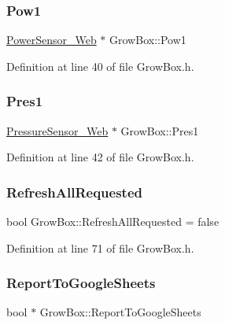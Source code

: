 \subsubsection{\texorpdfstring{Pow1}{Pow1}}
{\footnotesize\ttfamily \hyperlink{class_power_sensor___web}{Power\+Sensor\+\_\+\+Web} $\ast$ Grow\+Box\+::\+Pow1}



Definition at line 40 of file Grow\+Box.\+h.

\mbox{\label{class_grow_box_aa1868c61de725635c872ebae62f9d3a6}} 
\subsubsection{\texorpdfstring{Pres1}{Pres1}}
{\footnotesize\ttfamily \hyperlink{class_pressure_sensor___web}{Pressure\+Sensor\+\_\+\+Web} $\ast$ Grow\+Box\+::\+Pres1}



Definition at line 42 of file Grow\+Box.\+h.

\mbox{\label{class_grow_box_a7f3cd6990537a64901739ea4677693f8}} 
\subsubsection{\texorpdfstring{Refresh\+All\+Requested}{RefreshAllRequested}}
{\footnotesize\ttfamily bool Grow\+Box\+::\+Refresh\+All\+Requested = false\hspace{0.3cm}{\ttfamily [protected]}}



Definition at line 71 of file Grow\+Box.\+h.

\mbox{\label{class_grow_box_a6c689134f2556a744038a1c8075dcec8}} 
\subsubsection{\texorpdfstring{Report\+To\+Google\+Sheets}{ReportToGoogleSheets}}
{\footnotesize\ttfamily bool $\ast$ Grow\+Box\+::\+Report\+To\+Google\+Sheets\hspace{0.3cm}{\ttfamily [protected]}}



